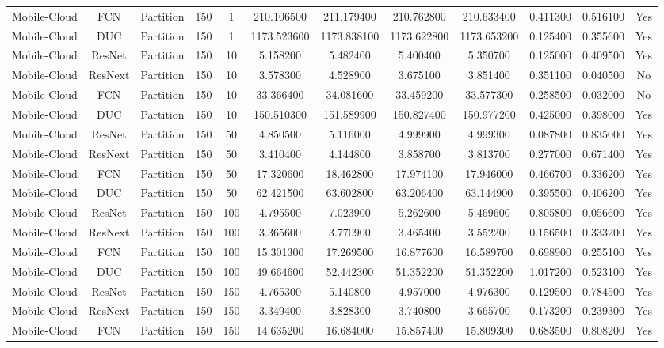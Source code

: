 \begin{tabular}{|c||c||c||c||c||c||c||c||c||c||c||c|}
Mobile-Cloud & FCN & Partition & 150 & 1 & 210.106500 & 211.179400 & 210.762800 & 210.633400 & 0.411300 & 0.516100 & Yes \\
Mobile-Cloud & DUC & Partition & 150 & 1 & 1173.523600 & 1173.838100 & 1173.622800 & 1173.653200 & 0.125400 & 0.355600 & Yes \\
Mobile-Cloud & ResNet & Partition & 150 & 10 & 5.158200 & 5.482400 & 5.400400 & 5.350700 & 0.125000 & 0.409500 & Yes \\
Mobile-Cloud & ResNext & Partition & 150 & 10 & 3.578300 & 4.528900 & 3.675100 & 3.851400 & 0.351100 & 0.040500 & No \\
Mobile-Cloud & FCN & Partition & 150 & 10 & 33.366400 & 34.081600 & 33.459200 & 33.577300 & 0.258500 & 0.032000 & No \\
Mobile-Cloud & DUC & Partition & 150 & 10 & 150.510300 & 151.589900 & 150.827400 & 150.977200 & 0.425000 & 0.398000 & Yes \\
Mobile-Cloud & ResNet & Partition & 150 & 50 & 4.850500 & 5.116000 & 4.999900 & 4.999300 & 0.087800 & 0.835000 & Yes \\
Mobile-Cloud & ResNext & Partition & 150 & 50 & 3.410400 & 4.144800 & 3.858700 & 3.813700 & 0.277000 & 0.671400 & Yes \\
Mobile-Cloud & FCN & Partition & 150 & 50 & 17.320600 & 18.462800 & 17.974100 & 17.946000 & 0.466700 & 0.336200 & Yes \\
Mobile-Cloud & DUC & Partition & 150 & 50 & 62.421500 & 63.602800 & 63.206400 & 63.144900 & 0.395500 & 0.406200 & Yes \\
Mobile-Cloud & ResNet & Partition & 150 & 100 & 4.795500 & 7.023900 & 5.262600 & 5.469600 & 0.805800 & 0.056600 & Yes \\
Mobile-Cloud & ResNext & Partition & 150 & 100 & 3.365600 & 3.770900 & 3.465400 & 3.552200 & 0.156500 & 0.333200 & Yes \\
Mobile-Cloud & FCN & Partition & 150 & 100 & 15.301300 & 17.269500 & 16.877600 & 16.589700 & 0.698900 & 0.255100 & Yes \\
Mobile-Cloud & DUC & Partition & 150 & 100 & 49.664600 & 52.442300 & 51.352200 & 51.352200 & 1.017200 & 0.523100 & Yes \\
Mobile-Cloud & ResNet & Partition & 150 & 150 & 4.765300 & 5.140800 & 4.957000 & 4.976300 & 0.129500 & 0.784500 & Yes \\
Mobile-Cloud & ResNext & Partition & 150 & 150 & 3.349400 & 3.828300 & 3.740800 & 3.665700 & 0.173200 & 0.239300 & Yes \\
Mobile-Cloud & FCN & Partition & 150 & 150 & 14.635200 & 16.684000 & 15.857400 & 15.809300 & 0.683500 & 0.808200 & Yes \\

\end{tabular}
